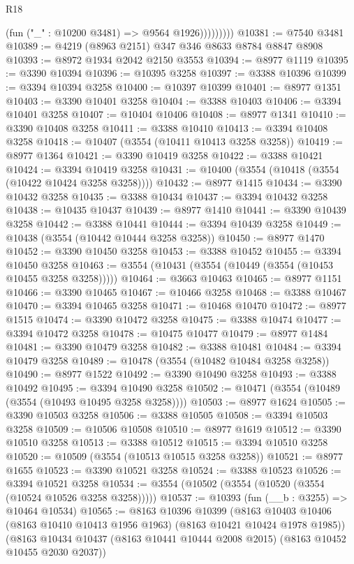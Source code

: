 \begin{lexlean}{R18}
\begin{coremodule}
                    (fun ("_" : @10200 @3481) => @9564 @1926)))))))))
@10381 := @7540 @3481
@10389 := @4219 (@8963 @2151) @347 @346 @8633 @8784 @8847 @8908
@10393 := @8972 @1934 @2042 @2150 @3553
@10394 := @8977 @1119
@10395 := @3390 @10394
@10396 := @10395 @3258
@10397 := @3388 @10396
@10399 := @3394 @10394 @3258
@10400 := @10397 @10399
@10401 := @8977 @1351
@10403 := @3390 @10401 @3258
@10404 := @3388 @10403
@10406 := @3394 @10401 @3258
@10407 := @10404 @10406
@10408 := @8977 @1341
@10410 := @3390 @10408 @3258
@10411 := @3388 @10410
@10413 := @3394 @10408 @3258
@10418 := @10407 (@3554 (@10411 @10413 @3258 @3258))
@10419 := @8977 @1364
@10421 := @3390 @10419 @3258
@10422 := @3388 @10421
@10424 := @3394 @10419 @3258
@10431 := @10400 (@3554 (@10418 (@3554 (@10422 @10424 @3258 @3258))))
@10432 := @8977 @1415
@10434 := @3390 @10432 @3258
@10435 := @3388 @10434
@10437 := @3394 @10432 @3258
@10438 := @10435 @10437
@10439 := @8977 @1410
@10441 := @3390 @10439 @3258
@10442 := @3388 @10441
@10444 := @3394 @10439 @3258
@10449 := @10438 (@3554 (@10442 @10444 @3258 @3258))
@10450 := @8977 @1470
@10452 := @3390 @10450 @3258
@10453 := @3388 @10452
@10455 := @3394 @10450 @3258
@10463 := @3554 (@10431 (@3554 (@10449 (@3554 (@10453 @10455 @3258 @3258)))))
@10464 := @3663 @10463
@10465 := @8977 @1151
@10466 := @3390 @10465
@10467 := @10466 @3258
@10468 := @3388 @10467
@10470 := @3394 @10465 @3258
@10471 := @10468 @10470
@10472 := @8977 @1515
@10474 := @3390 @10472 @3258
@10475 := @3388 @10474
@10477 := @3394 @10472 @3258
@10478 := @10475 @10477
@10479 := @8977 @1484
@10481 := @3390 @10479 @3258
@10482 := @3388 @10481
@10484 := @3394 @10479 @3258
@10489 := @10478 (@3554 (@10482 @10484 @3258 @3258))
@10490 := @8977 @1522
@10492 := @3390 @10490 @3258
@10493 := @3388 @10492
@10495 := @3394 @10490 @3258
@10502 := @10471 (@3554 (@10489 (@3554 (@10493 @10495 @3258 @3258))))
@10503 := @8977 @1624
@10505 := @3390 @10503 @3258
@10506 := @3388 @10505
@10508 := @3394 @10503 @3258
@10509 := @10506 @10508
@10510 := @8977 @1619
@10512 := @3390 @10510 @3258
@10513 := @3388 @10512
@10515 := @3394 @10510 @3258
@10520 := @10509 (@3554 (@10513 @10515 @3258 @3258))
@10521 := @8977 @1655
@10523 := @3390 @10521 @3258
@10524 := @3388 @10523
@10526 := @3394 @10521 @3258
@10534 := @3554 (@10502 (@3554 (@10520 (@3554 (@10524 @10526 @3258 @3258)))))
@10537 := @10393 (fun (__b : @3255) => @10464 @10534)
@10565 := @8163
    @10396
    @10399
    (@8163 @10403 @10406 (@8163 @10410 @10413 @1956 @1963) (@8163 @10421 @10424 @1978 @1985))
    (@8163 @10434 @10437 (@8163 @10441 @10444 @2008 @2015) (@8163 @10452 @10455 @2030 @2037))

\end{coremodule}
\end{lexlean}
